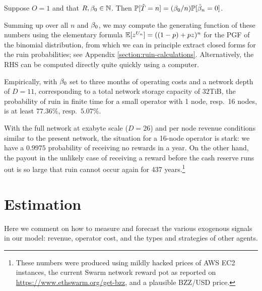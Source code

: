 \begin{proposition}

  Suppose $O=1$ and that $R,\beta_0\in\mathbb{N}$.
  Then $\mathbb{P}[\tilde{T}=n] = (\beta_0/n)\mathbb{P}[\tilde{\beta}_n=0]$.

\end{proposition}

Summing up over all $n$ and $\beta_0$, we may compute the generating function of these numbers using the elementary formula $\mathbb{E}[z^{U_n}] = ((1-p) + pz)^n$ for the PGF of the binomial distribution, from which we can in principle extract closed forms for the ruin probabilities; see Appendix \ref{section:ruin-calculations}.
%
Alternatively, the RHS can be computed directly quite quickly using a computer.    
  


\begin{example}

Empirically, with $\beta_0$ set to three months of operating costs and a network depth of $D=11$, corresponding to a total network storage capacity of $32$TiB, the probability of ruin in finite time for a small operator with 1 node, resp.~16 nodes, is at least $77.36\%$, resp.~$5.07\%$.
    
With the full network at exabyte scale ($D=26$) and per node revenue conditions similar to the present network, the situation for a 16-node operator is stark: we have a $0.9975$ probability of receiving no rewards in a year.
%
On the other hand, the payout in the unlikely case of receiving a reward before the cash reserve runs out is so large that ruin cannot occur again for 437 years.\footnote{These numbers were produced using mildly hacked prices of AWS EC2 instances, the current Swarm network reward pot as reported on \url{https://www.ethswarm.org/get-bzz}, and a plausible BZZ/USD price.}

\end{example}


\newpage

\section{Estimation}
\label{section:estimation}

\begin{notes}

  \item Here we comment on how to measure and forecast the various exogenous signals in our model: revenue, operator cost, and the types and strategies of other agents.

\end{notes}


